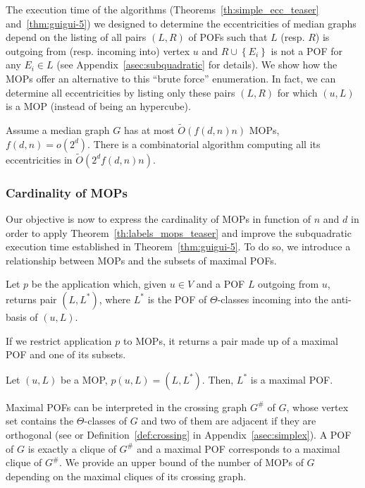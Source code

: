 \documentclass[a4paper,UKenglish,numberwithinsect,cleveref, autoref]{lipics-v2021}
\newcommand{\set}[1]{\left\{ #1 \right\}}
\begin{document}
The execution time of the algorithms (Theorems~\ref{th:simple_ecc_teaser} and~\ref{thm:guigui-5}) we designed to determine the eccentricities of median graphs depend on the listing of all pairs $(L,R)$ of POFs such that $L$ (resp. $R$) is outgoing from (resp. incoming into) vertex $u$ and $R \cup \set{E_i}$ is not a POF for any $E_i \in L$ (see Appendix~\ref{asec:subquadratic} for details). We show how the MOPs offer an alternative to this ``brute force'' enumeration. In fact, we can determine all eccentricities  by listing only these pairs $(L,R)$ for which $(u,L)$ is a MOP (instead of being an hypercube).

\begin{theorem}[\ref{th:labels_mops}]
Assume a median graph $G$ has at most $\tilde{O}(f(d,n)n)$ MOPs, $f(d,n) = o(2^d)$. There is a combinatorial algorithm computing all its eccentricities in $\tilde{O}(2^df(d,n)n)$.
\label{th:labels_mops_teaser}
\end{theorem}

\subsubsection{Cardinality of MOPs} \label{subsubsec:bound_mop}

Our objective is now to express the cardinality of MOPs in function of $n$ and $d$ in order to apply Theorem~\ref{th:labels_mops_teaser} and improve the subquadratic execution time established in Theorem~\ref{thm:guigui-5}. To do so, we introduce a relationship between MOPs and the subsets of maximal POFs.

\begin{definition}
Let $p$ be the application which, given $u \in V$ and a POF $L$ outgoing from $u$, returns pair $(L,L^*)$, where $L^*$ is the POF of $\Theta$-classes incoming into the anti-basis of $(u,L)$.
\end{definition}

If we restrict application $p$ to MOPs, it returns a pair made up of a maximal POF and one of its subsets.

\begin{lemma}[\ref{le:mop_max_subsets}]
Let $(u,L)$ be a MOP, $p(u,L) = (L,L^*)$. Then, $L^*$ is a maximal POF.
\label{le:mop_max_subsets_teaser}
\end{lemma}

Maximal POFs can be interpreted in the crossing graph $G^{\#}$ of $G$, whose vertex set contains the $\Theta$-classes of $G$ and two of them are adjacent if they are orthogonal (see \cite{KlKo09} or Definition~\ref{def:crossing} in Appendix~\ref{asec:simplex}). A POF of $G$ is exactly a clique of $G^{\#}$ and a maximal POF corresponds to a maximal clique of $G^{\#}$. We provide an upper bound of the number of MOPs of $G$ depending on the maximal cliques of its crossing graph.
\end{document}
